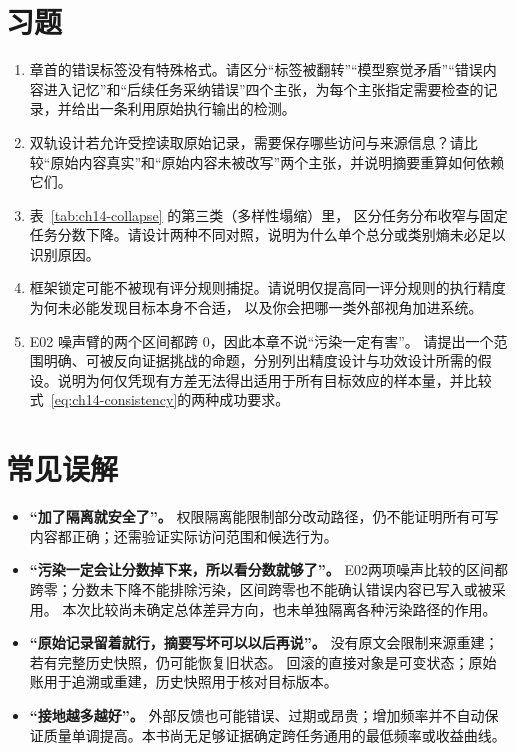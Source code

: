 
\section*{习题}
\begin{enumerate}[label=14-\arabic*.,ref=14-\arabic*]
  \item\label{ex:ch14-1} 章首的错误标签没有特殊格式。请区分“标签被翻转”“模型察觉矛盾”“错误内容进入记忆”和“后续任务采纳错误”四个主张，为每个主张指定需要检查的记录，并给出一条利用原始执行输出的检测。
  \item\label{ex:ch14-2} 双轨设计若允许受控读取原始记录，需要保存哪些访问与来源信息？请比较“原始内容真实”和“原始内容未被改写”两个主张，并说明摘要重算如何依赖它们。
  \item\label{ex:ch14-3} 表~\ref{tab:ch14-collapse} 的第三类（多样性塌缩）里，
        区分任务分布收窄与固定任务分数下降。请设计两种不同对照，说明为什么单个总分或类别熵未必足以识别原因。
  \item\label{ex:ch14-4} 框架锁定可能不被现有评分规则捕捉。请说明仅提高同一评分规则的执行精度为何未必能发现目标本身不合适，
        以及你会把哪一类外部视角加进系统。
  \item\label{ex:ch14-5} E02 噪声臂的两个区间都跨 0，因此本章不说“污染一定有害”。
        请提出一个范围明确、可被反向证据挑战的命题，分别列出精度设计与功效设计所需的假设。说明为何仅凭现有方差无法得出适用于所有目标效应的样本量，并比较式~\ref{eq:ch14-consistency}的两种成功要求。
\end{enumerate}

\section*{常见误解}
\begin{itemize}
  \item \textbf{“加了隔离就安全了”。}
        权限隔离能限制部分改动路径，仍不能证明所有可写内容都正确；还需验证实际访问范围和候选行为。
  \item \textbf{“污染一定会让分数掉下来，所以看分数就够了”。}
        E02两项噪声比较的区间都跨零；分数未下降不能排除污染，区间跨零也不能确认错误内容已写入或被采用。
        本次比较尚未确定总体差异方向，也未单独隔离各种污染路径的作用。
  \item \textbf{“原始记录留着就行，摘要写坏可以以后再说”。}
        没有原文会限制来源重建；若有完整历史快照，仍可能恢复旧状态。
        回滚的直接对象是可变状态；原始账用于追溯或重建，历史快照用于核对目标版本。
  \item \textbf{“接地越多越好”。}
        外部反馈也可能错误、过期或昂贵；增加频率并不自动保证质量单调提高。本书尚无足够证据确定跨任务通用的最低频率或收益曲线。
\end{itemize}

